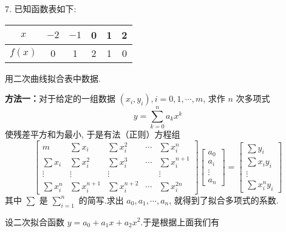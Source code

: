 \begin{tcolorbox}[breakable,enhanced,arc=0mm,outer arc=0mm,
		boxrule=0pt,toprule=1pt,leftrule=0pt,bottomrule=1pt, rightrule=0pt,left=0.2cm,right=0.2cm,
		titlerule=0.5em,toptitle=0.1cm,bottomtitle=-0.1cm,top=0.2cm,
		colframe=white!10!biru,colback=white!90!biru,coltitle=white,
            coltext=black,title =2024-03-10, title style={white!10!biru}, before skip=8pt, after skip=8pt,before upper=\hspace{2em},
		fonttitle=\bfseries,fontupper=\normalsize]
  
7. 已知函数表如下:
\begin{tabular}{|c|c|c|c|c|c|}
\hline$ x $ & $-2$ & $-1$ & 0 & 1 & 2 \\
\hline$ f(x) $ & 0 & 1 & 2 & 1 & 0 \\
\hline
\end{tabular}
用二次曲线拟合表中数据.

 \tcblower
\textbf{方法一：}对于给定的一组数据 $ \left(x_{i}, y_{i}\right), i=0,1, \cdots, m $, 求作 $ n $ 次多项式
$$
y=\sum_{k=0}^{n} a_{k} x^{k}
$$
使残差平方和为最小, 于是有法（正则）方程组
$$
\left[\begin{array}{ccccc}
m & \sum x_{i} & \sum x_{i}^{2} & \cdots & \sum x_{i}^{n} \\
\sum x_{i} & \sum x_{i}^{2} & \sum x_{i}^{3} & \cdots & \sum x_{i}^{n+1} \\
\vdots & \vdots & \vdots & & \vdots \\
\sum x_{i}^{n} & \sum x_{i}^{n+1} & \sum x_{i}^{n+2} & \cdots & \sum x_{i}^{2 n}
\end{array}\right]\left[\begin{array}{c}
a_{0} \\
a_{i} \\
\vdots \\
a_{n}
\end{array}\right]=\left[\begin{array}{c}
\sum y_{i} \\
\sum x_{i} y_{i} \\
\vdots \\
\sum x_{i}^{n} y_{i}
\end{array}\right]
$$
其中 $ \sum $ 是 $ \sum\limits_{i=1}^{n} $ 的简写.求出 $ a_{0}, a_{1}, \cdots, a_{n} $, 就得到了拟合多项式的系数.

设二次拟合函数 $ y=a_{0}+a_{1} x+a_{2} x^{2} $.于是根据上面我们有


\end{tcolorbox}
